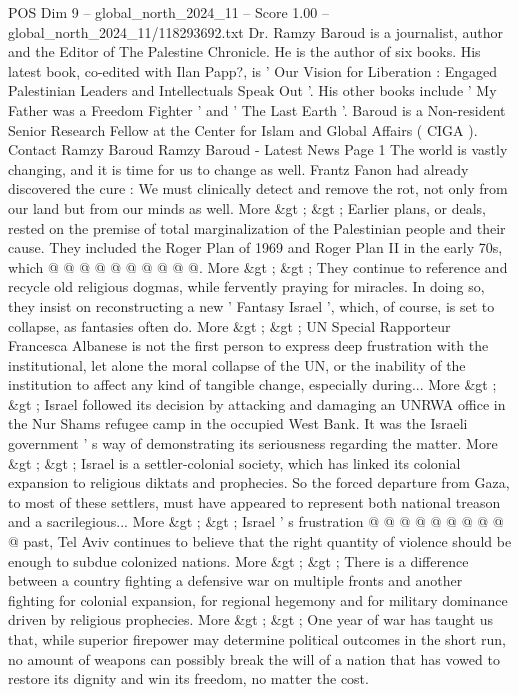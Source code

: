 \begin{textsample}{POS Dim 9 – global\_north\_2024\_11 – Score 1.00 – global\_north\_2024\_11/118293692.txt}  \label{ex:f9_pos_403}
Dr.
Ramzy Baroud is a journalist, author and the Editor of The Palestine Chronicle.
He is the author of six books.
His latest book, co-edited with Ilan Papp?, is ' Our Vision for Liberation : Engaged Palestinian Leaders and Intellectuals Speak Out '.
His other books include ' My Father was a Freedom Fighter ' and ' The Last Earth '.
Baroud is a Non-resident Senior Research Fellow at the Center for Islam and Global Affairs ( CIGA ).
Contact Ramzy Baroud Ramzy Baroud - Latest News Page 1 The world is vastly changing, and it is time for us to change as well.
Frantz Fanon had already discovered the cure : We must clinically detect and remove the rot, not only from our land but from our minds as well.
More \&gt ; \&gt ; Earlier plans, or deals, rested on the premise of total marginalization of the Palestinian people and their cause.
They included the Roger Plan of 1969 and Roger Plan II in the early 70s, which @ @ @ @ @ @ @ @ @ @.
More \&gt ; \&gt ; They continue to reference and recycle old religious dogmas, while fervently praying for miracles.
In doing so, they insist on reconstructing a new ' Fantasy Israel ', which, of course, is set to collapse, as fantasies often do.
More \&gt ; \&gt ; UN Special Rapporteur Francesca Albanese is not the first person to express deep frustration with the institutional, let alone the moral collapse of the UN, or the inability of the institution to affect any kind of tangible change, especially during...
More \&gt ; \&gt ; Israel followed its decision by attacking and damaging an UNRWA office in the Nur Shams refugee camp in the occupied West Bank.
It was the Israeli government ' s way of demonstrating its seriousness regarding the matter.
More \&gt ; \&gt ; Israel is a settler-colonial society, which has linked its colonial expansion to religious diktats and prophecies.
So the forced departure from Gaza, to most of these settlers, must have appeared to represent both national treason and a sacrilegious...
More \&gt ; \&gt ; Israel ' s frustration @ @ @ @ @ @ @ @ @ @ past, Tel Aviv continues to believe that the right quantity of violence should be enough to subdue colonized nations.
More \&gt ; \&gt ; There is a difference between a country fighting a defensive war on multiple fronts and another fighting for colonial expansion, for regional hegemony and for military dominance driven by religious prophecies.
More \&gt ; \&gt ; One year of war has taught us that, while superior firepower may determine political outcomes in the short run, no amount of weapons can possibly break the will of a nation that has vowed to restore its dignity and win its freedom, no matter the cost.

\end{textsample}

